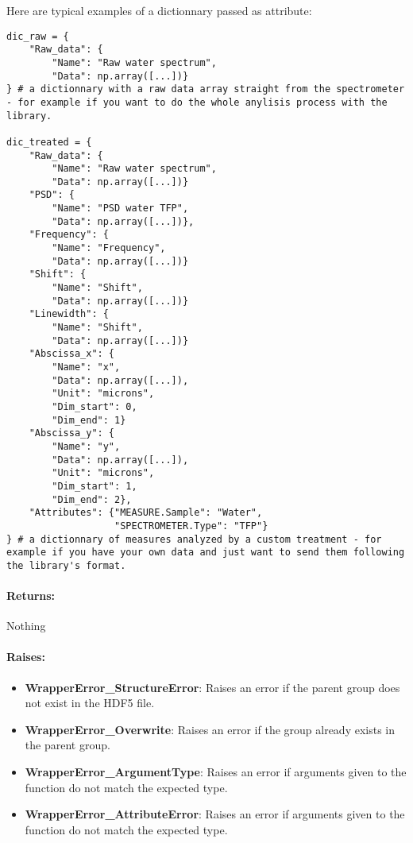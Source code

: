Here are typical examples of a dictionnary passed as attribute:
\begin{lstlisting}
dic_raw = {
    "Raw_data": {
        "Name": "Raw water spectrum", 
        "Data": np.array([...])}
} # a dictionnary with a raw data array straight from the spectrometer - for example if you want to do the whole anylisis process with the library.

dic_treated = {
    "Raw_data": {
        "Name": "Raw water spectrum", 
        "Data": np.array([...])}
    "PSD": {
        "Name": "PSD water TFP", 
        "Data": np.array([...])},
    "Frequency": {
        "Name": "Frequency", 
        "Data": np.array([...])}
    "Shift": {
        "Name": "Shift", 
        "Data": np.array([...])}
    "Linewidth": {
        "Name": "Shift", 
        "Data": np.array([...])}
    "Abscissa_x": {
        "Name": "x", 
        "Data": np.array([...]),
        "Unit": "microns",
        "Dim_start": 0,
        "Dim_end": 1}
    "Abscissa_y": {
        "Name": "y", 
        "Data": np.array([...]),
        "Unit": "microns",
        "Dim_start": 1,
        "Dim_end": 2},
    "Attributes": {"MEASURE.Sample": "Water",
                   "SPECTROMETER.Type": "TFP"}
} # a dictionnary of measures analyzed by a custom treatment - for example if you have your own data and just want to send them following the library's format.
\end{lstlisting}

\paragraph{Returns:} Nothing

\paragraph{Raises:}

\begin{itemize}
    \item \textbf{WrapperError\_StructureError}: Raises an error if the parent group does not exist in the HDF5 file.
    \item \textbf{WrapperError\_Overwrite}: Raises an error if the group already exists in the parent group.
    \item \textbf{WrapperError\_ArgumentType}: Raises an error if arguments given to the function do not match the expected type.
    \item \textbf{WrapperError\_AttributeError}: Raises an error if arguments given to the function do not match the expected type.
\end{itemize}

